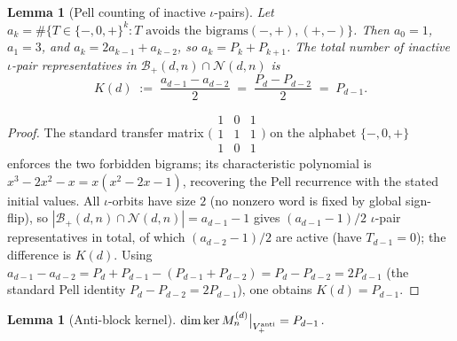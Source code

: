 \documentclass{amsart}
\newtheorem{lemma}[theorem]{Lemma}
\theoremstyle{definition}
\theoremstyle{remark}
\begin{document}
\begin{lemma}[Pell counting of inactive $\iota$-pairs]
\label{lem:pell-inactive}
Let $a_k = \#\{T \in \{-, 0, +\}^k : T \text{ avoids the bigrams
} (-, +), (+, -)\}$.  Then $a_0 = 1$, $a_1 = 3$, and
$a_k = 2 a_{k-1} + a_{k-2}$, so $a_k = P_k + P_{k+1}$.  The total
number of inactive $\iota$-pair representatives in
$\mathcal{B}_+(d, n) \cap \mathcal{N}(d, n)$ is
\begin{equation}\label{eq:K-d}
  K(d) \;:=\; \frac{a_{d-1} - a_{d-2}}{2}
  \;=\; \frac{P_d - P_{d-2}}{2}
  \;=\; P_{d-1}.
\end{equation}
\end{lemma}

\begin{proof}
The standard transfer matrix $\bigl(\begin{smallmatrix}
1 & 0 & 1\\ 1 & 1 & 1\\ 1 & 0 & 1
\end{smallmatrix}\bigr)$ on the alphabet $\{-, 0, +\}$ enforces
the two forbidden bigrams; its characteristic polynomial is
$x^3 - 2x^2 - x = x(x^2 - 2x - 1)$, recovering the Pell
recurrence with the stated initial values.  All $\iota$-orbits
have size $2$ (no nonzero word is fixed by global sign-flip),
so $|\mathcal{B}_+(d, n) \cap \mathcal{N}(d, n)| = a_{d-1} - 1$
gives $(a_{d-1} - 1)/2$ $\iota$-pair representatives in total, of
which $(a_{d-2} - 1)/2$ are active (have $T_{d-1} = 0$); the
difference is $K(d)$.  Using $a_{d-1} - a_{d-2} = P_d + P_{d-1}
- (P_{d-1} + P_{d-2}) = P_d - P_{d-2} = 2 P_{d-1}$
(the standard Pell identity $P_d - P_{d-2} = 2 P_{d-1}$),
one obtains $K(d) = P_{d-1}$.
\end{proof}

\begin{lemma}[Anti-block kernel]
\label{lem:nullity-anti}
$\dim \ker M_n^{(d)}\big|_{V_+^{\rm anti}} = P_{d-1}$.
\end{lemma}
\end{document}
